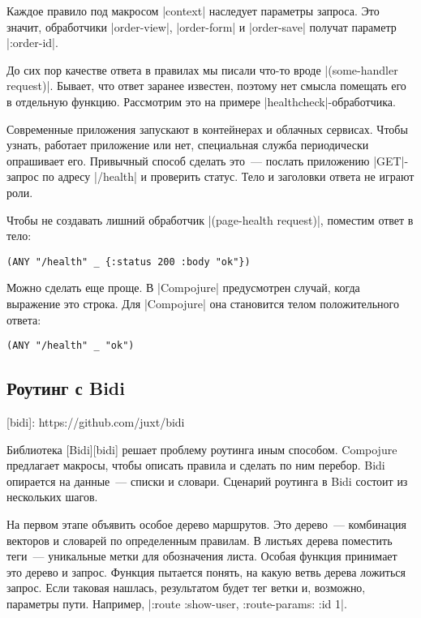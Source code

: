 Каждое правило под макросом \spverb|context| наследует параметры запроса. Это значит,
обработчики \spverb|order-view|, \spverb|order-form| и \spverb|order-save| получат
параметр \spverb|:order-id|.

До сих пор качестве ответа в правилах мы писали что-то вроде
\spverb|(some-handler request)|. Бывает, что ответ заранее известен,
поэтому нет смысла помещать его в отдельную функцию. Рассмотрим это на примере
\spverb|healthcheck|-обработчика.

Современные приложения запускают в контейнерах и облачных сервисах.  Чтобы
узнать, работает приложение или нет, специальная служба периодически опрашивает
его. Привычный способ сделать это~--- послать приложению \spverb|GET|-запрос по адресу
\spverb|/health| и проверить статус. Тело и заголовки ответа не играют роли.

Чтобы не создавать лишний обработчик \spverb|(page-health request)|, поместим ответ в
тело:

\begin{verbatim}
(ANY "/health" _ {:status 200 :body "ok"})
\end{verbatim}

Можно сделать еще проще. В \spverb|Compojure| предусмотрен случай, когда
выражение это строка. Для \spverb|Compojure| она становится телом положительного
ответа:

\begin{verbatim}
(ANY "/health" _ "ok")
\end{verbatim}

\subsection{Роутинг с Bidi}

[bidi]: https://github.com/juxt/bidi

Библиотека [Bidi][bidi] решает проблему роутинга иным способом. Compojure
предлагает макросы, чтобы описать правила и сделать по ним перебор. Bidi
опирается на данные~--- списки и словари. Сценарий роутинга в Bidi состоит из
нескольких шагов.

На первом этапе объявить особое дерево маршрутов. Это дерево~--- комбинация
векторов и словарей по определенным правилам. В листьях дерева поместить теги~---
уникальные метки для обозначения листа. Особая функция принимает это дерево и
запрос. Функция пытается понять, на какую ветвь дерева ложиться запрос. Если
таковая нашлась, результатом будет тег ветки и, возможно, параметры
пути. Например, \spverb|{:route :show-user, :route-params: {:id 1}}|.

